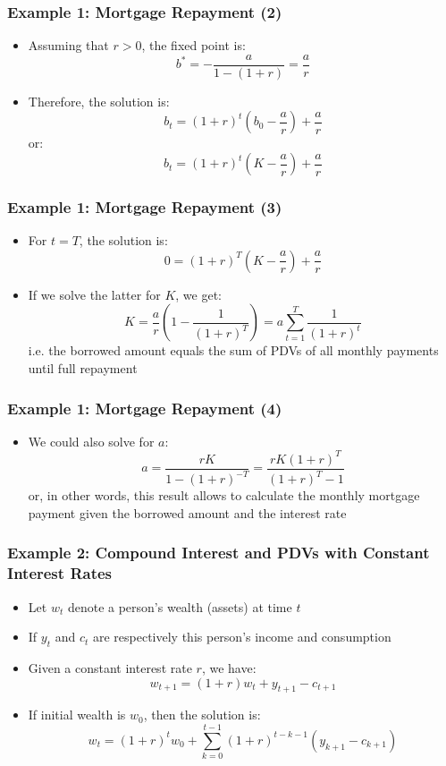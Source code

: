 \documentclass[10pt,usenames,dvipsnames]{beamer}
\theoremstyle{definition}
\begin{document}
\begin{frame}[fragile]
\frametitle{Example 1: Mortgage Repayment (2)}
\begin{itemize}
	\item Assuming that $r > 0$, the fixed point is:
	\[
		b^{*} = -\frac{a}{1 - (1+r)} = \frac{a}{r}
	\]
	\item Therefore, the solution is:
	\[
		b_{t} = (1+r)^{t}\left(b_{0} - \frac{a}{r}\right) + \frac{a}{r}
	\]
	or:
	\[
		b_{t} = (1+r)^{t}\left(K - \frac{a}{r}\right) + \frac{a}{r}
	\]
\end{itemize}
\end{frame}

\begin{frame}[fragile]
\frametitle{Example 1: Mortgage Repayment (3)}
\begin{itemize}
	\item For $t=T$, the solution is:
	\[
		0 = (1+r)^{T}\left(K - \frac{a}{r}\right) + \frac{a}{r}
	\]
	\item If we solve the latter for $K$, we get:
	\[
		K = \frac{a}{r}\left(1 - \frac{1}{(1+r)^{T}}\right) = a\sum_{t=1}^{T}\frac{1}{(1+r)^{t}}
	\]
	i.e. the borrowed amount equals the sum of PDVs of all monthly payments until full repayment
\end{itemize}
\end{frame}

\begin{frame}[fragile]
\frametitle{Example 1: Mortgage Repayment (4)}
\begin{itemize}
	\item We could also solve for $a$:
	\[
		a = \frac{rK}{1 - (1+r)^{-T}} = \frac{rK(1+r)^{T}}{(1+r)^{T} - 1}
	\]
	or, in other words, this result allows to calculate the monthly mortgage payment given the borrowed amount and the interest rate
\end{itemize}
\end{frame}

\begin{frame}[fragile]
\frametitle{Example 2: Compound Interest and PDVs with Constant Interest Rates}
\begin{itemize}
	\item Let $w_{t}$ denote a person's wealth (assets) at time $t$
	\item If $y_{t}$ and $c_{t}$ are respectively this person's income and consumption
	\item Given a constant interest rate $r$, we have:
	\[
		w_{t+1} = (1+r)w_{t} + y_{t+1} - c_{t+1}
	\]
	\item If initial wealth is $w_{0}$, then the solution is:
	\[
		w_{t} = (1+r)^{t}w_{0} + \sum_{k=0}^{t-1}(1+r)^{t-k-1}(y_{k+1} - c_{k+1})
	\]
\end{itemize}
\end{frame}
\end{document}

